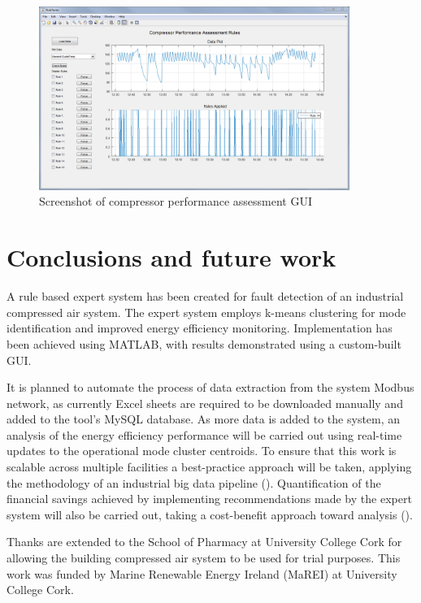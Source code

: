 \begin{figure}
\includegraphics[width = 0.9\textwidth]{./Images/RuleTester.png}
\caption{Screenshot of compressor performance assessment GUI}
\label{fig:ruletester}
\end{figure}


\section{Conclusions and future work}
\label{sec:conclusions}
A rule based expert system has been created for fault detection of an industrial compressed air system. The expert system employs k-means clustering for mode identification and improved energy efficiency monitoring. Implementation has been achieved using MATLAB, with results demonstrated using a custom-built GUI.

It is planned to automate the process of data extraction from the system Modbus network, as currently Excel sheets are required to be downloaded manually and added to the tool's MySQL database. As more data is added to the system, an analysis of the energy efficiency performance will be carried out using real-time updates to the operational mode cluster centroids. To ensure that this work is scalable across multiple facilities a best-practice approach will be taken, applying the methodology of an industrial big data pipeline (\cite{ODonovan2015a}). Quantification of the financial savings achieved by implementing recommendations made by the expert system will also be carried out, taking a cost-benefit approach toward analysis (\cite{Walsh2013}).


\begin{acknowledgements}
Thanks are extended to the School of Pharmacy at University College Cork for allowing the building compressed air system to be used for trial purposes. This work was funded by Marine Renewable Energy Ireland (MaREI) at University College Cork.
\end{acknowledgements}


